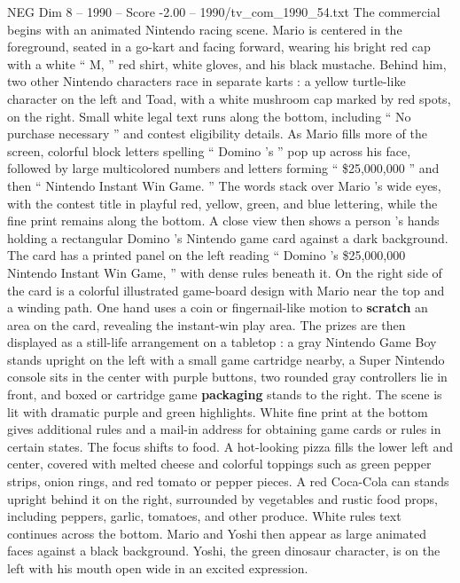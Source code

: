 \begin{textsample}{NEG Dim 8 – 1990 – Score -2.00 – 1990/tv\_com\_1990\_54.txt}  \label{ex:f8_neg_038}
The commercial begins with an animated Nintendo racing scene.
Mario is centered in the foreground, seated in a go-kart and facing forward, wearing his bright red cap with a white “ M, ” red shirt, white gloves, and his black mustache.
Behind him, two other Nintendo characters race in separate karts : a yellow turtle-like character on the left and Toad, with a white mushroom cap marked by red spots, on the right.
Small white legal text runs along the bottom, including “ No purchase necessary ” and contest eligibility details.
As Mario fills more of the screen, colorful block letters spelling “ Domino ’s ” pop up across his face, followed by large multicolored numbers and letters forming “ \$25,000,000 ” and then “ Nintendo Instant Win Game. ” The words stack over Mario ’s wide eyes, with the contest title in playful red, yellow, green, and blue lettering, while the fine print remains along the bottom.
A close view then shows a person ’s hands holding a rectangular Domino ’s Nintendo game card against a dark background.
The card has a printed panel on the left reading “ Domino ’s \$25,000,000 Nintendo Instant Win Game, ” with dense rules beneath it.
On the right side of the card is a colorful illustrated game-board design with Mario near the top and a winding path.
One hand uses a coin or fingernail-like motion to \textbf{scratch} an area on the card, revealing the instant-win play area.
The prizes are then displayed as a still-life arrangement on a tabletop : a gray Nintendo Game Boy stands upright on the left with a small game cartridge nearby, a Super Nintendo console sits in the center with purple buttons, two rounded gray controllers lie in front, and boxed or cartridge game \textbf{packaging} stands to the right.
The scene is lit with dramatic purple and green highlights.
White fine print at the bottom gives additional rules and a mail-in address for obtaining game cards or rules in certain states.
The focus shifts to food.
A hot-looking pizza fills the lower left and center, covered with melted cheese and colorful toppings such as green pepper strips, onion rings, and red tomato or pepper pieces.
A red Coca-Cola can stands upright behind it on the right, surrounded by vegetables and rustic food props, including peppers, garlic, tomatoes, and other produce.
White rules text continues across the bottom.
Mario and Yoshi then appear as large animated faces against a black background.
Yoshi, the green dinosaur character, is on the left with his mouth open wide in an excited expression.

\end{textsample}
